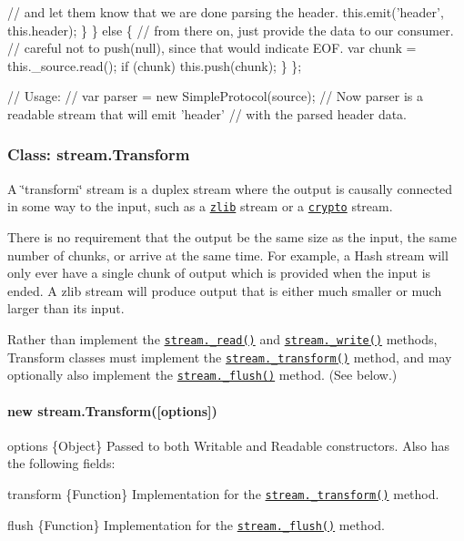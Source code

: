 \begin{DoxyCode}
      // and let them know that we are done parsing the header.
      this.emit('header', this.header);
    \}
  \} else \{
    // from there on, just provide the data to our consumer.
    // careful not to push(null), since that would indicate EOF.
    var chunk = this.\_source.read();
    if (chunk) this.push(chunk);
  \}
\};

// Usage:
// var parser = new SimpleProtocol(source);
// Now parser is a readable stream that will emit 'header'
// with the parsed header data.
\end{DoxyCode}


\subsubsection*{Class\+: stream.\+Transform}

A \char`\"{}transform\char`\"{} stream is a duplex stream where the output is causally connected in some way to the input, such as a \href{zlib.html}{\tt zlib} stream or a \href{crypto.html}{\tt crypto} stream.

There is no requirement that the output be the same size as the input, the same number of chunks, or arrive at the same time. For example, a Hash stream will only ever have a single chunk of output which is provided when the input is ended. A zlib stream will produce output that is either much smaller or much larger than its input.

Rather than implement the \href{#stream_readable_read_size_1}{\tt {\ttfamily stream.\+\_\+read()}} and \href{#stream_writable_write_chunk_encoding_callback_1}{\tt {\ttfamily stream.\+\_\+write()}} methods, Transform classes must implement the \href{#stream_transform_transform_chunk_encoding_callback}{\tt {\ttfamily stream.\+\_\+transform()}} method, and may optionally also implement the \href{#stream_transform_flush_callback}{\tt {\ttfamily stream.\+\_\+flush()}} method. (See below.)

\paragraph*{new stream.\+Transform(\mbox{[}options\mbox{]})}


\begin{DoxyItemize}
\item {\ttfamily options} \{Object\} Passed to both Writable and Readable constructors. Also has the following fields\+:
\begin{DoxyItemize}
\item {\ttfamily transform} \{Function\} Implementation for the \href{#stream_transform_transform_chunk_encoding_callback}{\tt {\ttfamily stream.\+\_\+transform()}} method.
\item {\ttfamily flush} \{Function\} Implementation for the \href{#stream_transform_flush_callback}{\tt {\ttfamily stream.\+\_\+flush()}} method.
\end{DoxyItemize}
\end{DoxyItemize}

